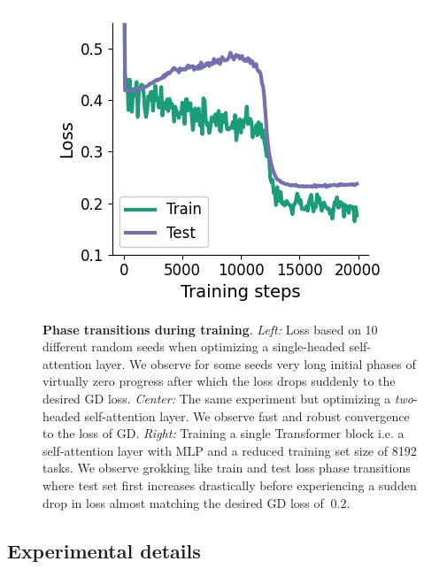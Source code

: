 \documentclass{article}
\theoremstyle{plain}
\theoremstyle{definition}
\theoremstyle{remark}
\begin{document}
\begin{figure}
\begin{center}
\begin{minipage}{.32\textwidth}
\begin{center}
  \end{center}
\end{minipage}
\begin{minipage}{.3\textwidth}
  \centering
  \begin{center}
    \includegraphics[width=.9\textwidth]{Final_figures/grokking/grokking.png}
  \end{center}
\end{minipage}
\end{center}
  \caption{\textbf{Phase transitions during training}. \textit{Left:} Loss based on 10 different random seeds when optimizing a single-headed self-attention layer. We observe for some seeds very long initial phases of virtually zero progress after which the loss drops suddenly to the desired GD loss. \textit{Center:} The same experiment but optimizing a \textit{two}-headed self-attention layer. We observe fast and robust convergence to the loss of GD.
  \textit{Right:} Training a single Transformer block i.e. a self-attention layer with MLP and a reduced training set size of 8192 tasks. We observe grokking like train and test loss phase transitions where test set first increases drastically before experiencing a sudden drop in loss almost matching the desired GD loss of $~0.2$.  }
  \label{fig:grokking}
  \vspace{-10pt}
\end{figure}


\subsection{Experimental details}
\end{document}
